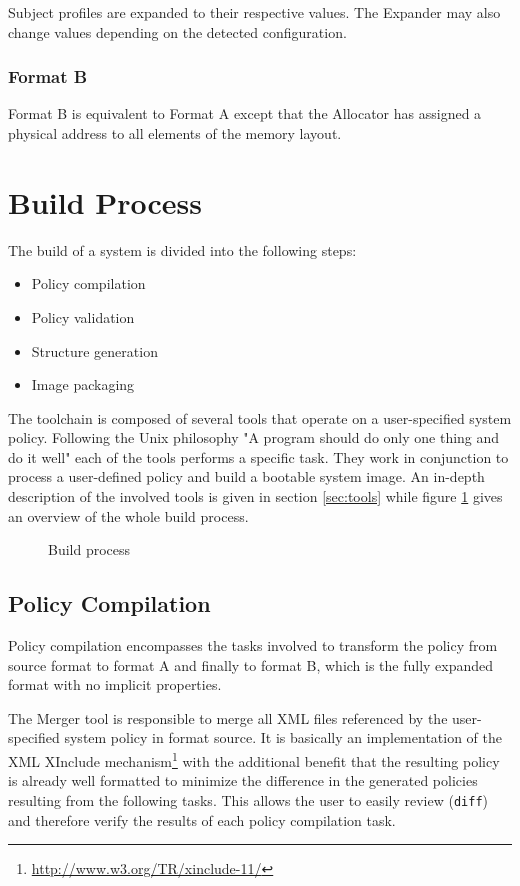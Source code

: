 \documentclass[a4paper,twoside,titlepage]{article}
\begin{document}
Subject profiles are expanded to their respective values. The Expander may also
change values depending on the detected configuration.

\subsubsection{Format B}
Format B is equivalent to Format A except that the Allocator has assigned a
physical address to all elements of the memory layout.

\section{Build Process}
The build of a system is divided into the following steps:

\begin{itemize}
	\item Policy compilation
	\item Policy validation
	\item Structure generation
	\item Image packaging
\end{itemize}

The toolchain is composed of several tools that operate on a user-specified
system policy. Following the Unix philosophy "A program should do only one thing
and do it well" each of the tools performs a specific task. They work in
conjunction to process a user-defined policy and build a bootable system image.
An in-depth description of the involved tools is given in section
\ref{sec:tools} while figure \ref{fig:build-process} gives an overview of the
whole build process.

\begin{figure}[h]
	\centering
	
	\caption{Build process}
	\label{fig:build-process}
\end{figure}

\subsection{Policy Compilation}
Policy compilation encompasses the tasks involved to transform the policy from
source format to format A and finally to format B, which is the fully expanded
format with no implicit properties.

The Merger tool is responsible to merge all XML files referenced by the
user-specified system policy in format source. It is basically an implementation
of the XML XInclude mechanism\footnote{\url{http://www.w3.org/TR/xinclude-11/}}
with the additional benefit that the resulting policy is already well formatted
to minimize the difference in the generated policies resulting from the
following tasks.  This allows the user to easily review (\texttt{diff}) and
therefore verify the results of each policy compilation task.
\end{document}
